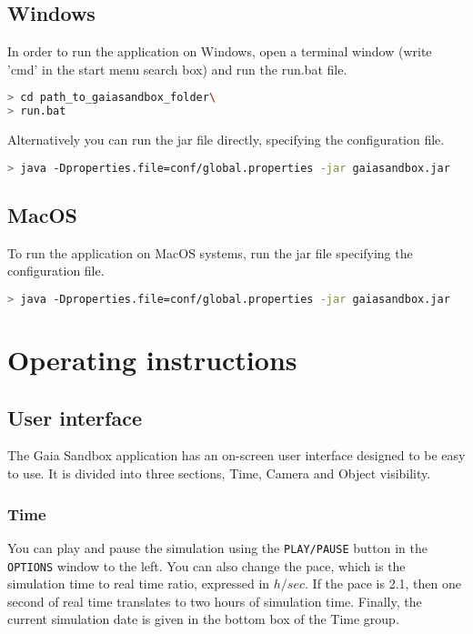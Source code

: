 \documentclass[
a4paper, %
11pt, %
onecolumn, %
openany, %
]{memoir}
\begin{document}
\subsection{Windows}
In order to run the application on Windows, open a terminal window (write
'cmd' in the start menu search box) and run the run.bat file.

\begin{lstlisting}[language=bash,basicstyle={\tiny\ttfamily}]
> cd path_to_gaiasandbox_folder\
> run.bat
\end{lstlisting}
	
Alternatively you can run the jar file directly, specifying the configuration
file.

\begin{lstlisting}[language=bash,basicstyle={\tiny\ttfamily}]
> java -Dproperties.file=conf/global.properties -jar gaiasandbox.jar
\end{lstlisting}

\subsection{MacOS}
To run the application on MacOS systems, run the jar file specifying the
configuration file.

\begin{lstlisting}[language=bash,basicstyle={\tiny\ttfamily}]
> java -Dproperties.file=conf/global.properties -jar gaiasandbox.jar
\end{lstlisting}

\section{Operating instructions}

\subsection{User interface}
The Gaia Sandbox application has an on-screen user interface designed to be
easy to use. It is divided into three sections, Time, Camera and Object
visibility.

\subsubsection{Time}
You can play and pause the simulation using the \texttt{PLAY/PAUSE} button in the
\texttt{OPTIONS} window to the left. You can also change the pace, which is the 
simulation time to real time ratio, expressed in $h/sec$. If the pace is 2.1, then
one second of real time translates to two hours of simulation time.
Finally, the current simulation date is given in the bottom box of
the Time group.
\end{document}
